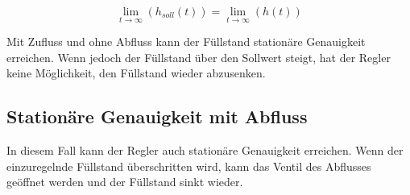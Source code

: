 \begin{equation}
    \lim_{t \to \infty} \left(h_{soll}(t)\right) = \lim_{t \to \infty} \left(h(t)\right)
\end{equation}

Mit Zufluss und ohne Abfluss kann der Füllstand stationäre Genauigkeit erreichen. Wenn jedoch der Füllstand über den Sollwert steigt, hat der Regler keine Möglichkeit, den Füllstand wieder abzusenken. 

\subsection{Stationäre Genauigkeit mit Abfluss}
In diesem Fall kann der Regler auch stationäre Genauigkeit erreichen. Wenn der einzuregelnde Füllstand überschritten wird, kann das Ventil des Abflusses geöffnet werden und der Füllstand sinkt wieder.

